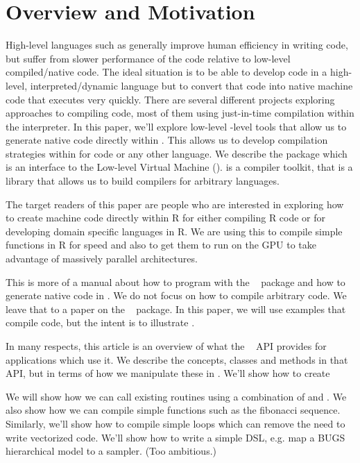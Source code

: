 \section{Overview and Motivation}\label{sec:Introduction}

High-level languages such as \R{} generally improve human efficiency
in writing code, but suffer from slower performance of the code
relative to low-level compiled/native code.  The ideal situation is to
be able to develop code in a high-level, interpreted/dynamic language
but to convert that code into native machine code that executes very
quickly. There are several different projects exploring approaches to
compiling \R{} code, most of them using just-in-time compilation
within the interpreter.  In this paper, we'll explore low-level
\R-level tools that allow us to generate native code directly within
\R.  This allows us to develop compilation strategies within \R{} for
\R{} code or any other language.  We describe the  package
which is an interface to the Low-level Virtual Machine (\llvm).
\llvm{} is a compiler toolkit, that is a \Cpp{} library that allows us
to build compilers for arbitrary languages.


The target readers of this paper are people who are interested in
exploring how to create machine code directly within R for either
compiling R code or for developing domain specific languages in R.  We
are using this to compile simple functions in R for speed and also to
get them to run on the GPU to take advantage of massively parallel
architectures.

This is more of a manual about how to program with the
~\cite{bib:Rllvm} package and how to generate native code
in \R.  We do not focus on how to compile arbitrary \R{} code.  We
leave that to a paper on the
~\cite{bib:RLLVMCompile} package.  In this paper,
we will use examples that compile \R{} code, but the intent is to
illustrate .

In many respects, this article is an overview of what the \llvm~\cite{bib:llvm}
API provides for applications which use it. We describe the concepts,
classes and methods in that API, but in terms of how we manipulate these
in \R.
We'll show how to create

We will show how we can call existing \C{} routines using a
combination of \RClang{} and \Rllvm.  We also show how we can compile
simple functions such as the fibonacci sequence.  Similarly, we'll
show how to compile simple loops which can remove the need to write
vectorized code.  We'll show how to write a simple DSL, e.g. map a
BUGS hierarchical model to a sampler. (Too ambitious.)


